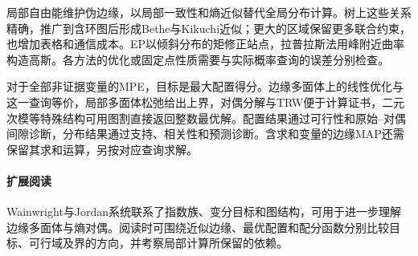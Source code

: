 局部自由能维护伪边缘，以局部一致性和熵近似替代全局分布计算。树上这些关系精确，推广到含环图后形成Bethe与Kikuchi近似；更大的区域保留更多联合约束，也增加表格和通信成本。EP以倾斜分布的矩修正站点，拉普拉斯法用峰附近曲率构造高斯。各方法的优化或固定点性质需要与实际概率查询的误差分别检查。

对于全部非证据变量的MPE，目标是最大配置得分。边缘多面体上的线性优化与这一查询等价，局部多面体松弛给出上界，对偶分解与TRW便于计算证书，二元次模等特殊结构可用图割直接返回整数最优解。配置结果通过可行性和原始--对偶间隙诊断，分布结果通过支持、相关性和预测诊断。含求和变量的边缘MAP还需保留其求和运算，另按对应查询求解。

\paragraph{扩展阅读}
Wainwright与Jordan系统联系了指数族、变分目标和图结构，可用于进一步理解边缘多面体与熵对偶。阅读时可围绕近似边缘、最优配置和配分函数分别比较目标、可行域及界的方向，并考察局部计算所保留的依赖。
